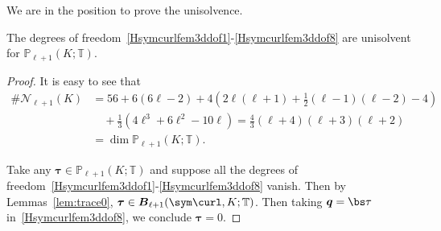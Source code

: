 We are in the position to prove the unisolvence. 
\begin{theorem}\label{lem:unisovlenHsymcurlfem}
The degrees of freedom~\eqref{Hsymcurlfem3ddof1}-\eqref{Hsymcurlfem3ddof8} are unisolvent for $\mathbb P_{\ell+1}(K;\mathbb T)$.
\end{theorem}
\begin{proof}
It is easy to see that
\begin{align*}
\#\mathcal N_{\ell+1}(K)&= 56+ 6(6\ell-2) + 4\left(2\ell(\ell+1) + \frac{1}{2}(\ell-1)(\ell-2)-4\right) \\
&\quad+ \frac{1}{3}(4\ell^3+6\ell^2-10\ell)
=\frac{4}{3}(\ell+4)(\ell+3)(\ell+2)\\
&=\dim\mathbb P_{\ell+1}(K;\mathbb T).
\end{align*}

Take any $\boldsymbol \tau\in\mathbb P_{\ell+1}(K;\mathbb T)$ and
suppose all the degrees of freedom~\eqref{Hsymcurlfem3ddof1}-\eqref{Hsymcurlfem3ddof8} vanish. Then by Lemmas~\ref{lem:trace0}, $\boldsymbol \tau\in \boldsymbol B_{\ell+1}(\sym\curl, K;\mathbb T)$. Then taking $\boldsymbol q = \bs \tau$ in~\eqref{Hsymcurlfem3ddof8}, we conclude $\boldsymbol \tau = 0$. 
\end{proof}

%



